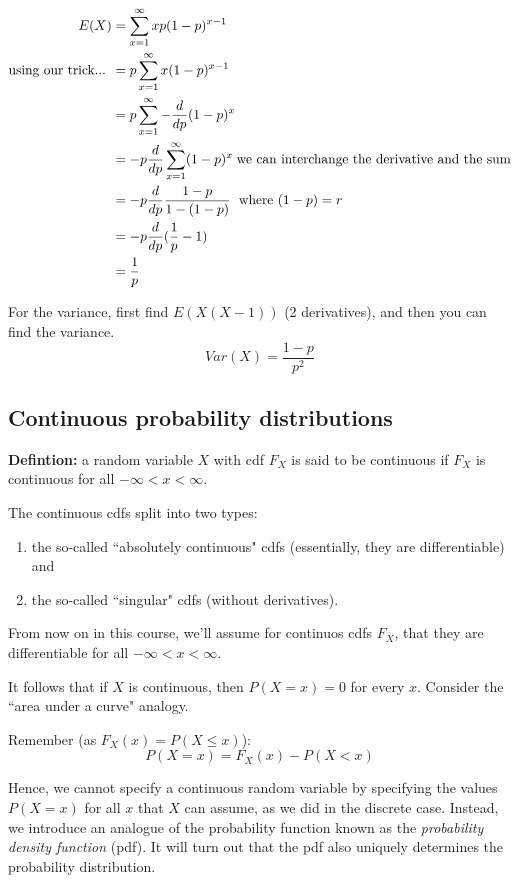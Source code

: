 \documentclass[12pt]{article}
\begin{document}
\begin{align*}
    E(X) &= \sum_{x=1}^{\infty} x p (1-p)^{x-1} \\
    \textnormal{using our trick... }   &=  p \sum_{x=1}^{\infty} x (1-p)^{x-1} \\
        &= p \sum_{x=1}^{\infty} - \frac{d}{dp} (1-p)^{x} \\
        &= -p \frac{d}{dp} \sum_{x=1}^{\infty} (1-p)^{x} \; \textnormal{we can interchange the derivative and the sum} \\
        &= -p \frac{d}{dp} \frac{1-p}{1-(1-p)} \; \textnormal{ where } (1-p) = r \\
        &= -p \frac{d}{dp} (\frac{1}{p} - 1) \\
        &= \frac{1}{p}
\end{align*}

For the variance, first find $E(X(X-1))$ (2 derivatives), and then you can find the variance.
\[
    Var(X) = \frac{1-p}{p^2}
\]

\subsection{Continuous probability distributions}
\textbf{Defintion:} a random variable $X$ with cdf $F_X$ is said to be continuous if $F_X$ is continuous for all $- \infty < x < \infty$.

The continuous cdfs split into two types:
\begin{enumerate}
    \item the so-called ``absolutely continuous" cdfs (essentially, they are differentiable) and
    \item the so-called ``singular" cdfs (without derivatives).
\end{enumerate}

From now on in this course, we'll assume for continuos cdfs $F_X$, that they are differentiable for all $- \infty < x < \infty$.

It follows that if $X$ is continuous, then $P(X=x)=0$ for every $x$. Consider the ``area under a curve" analogy.

Remember (as $F_X (x) = P(X \leq x)$):
\[
    P(X=x) = F_X (x) - P(X < x)
\]

Hence, we cannot specify a continuous random variable by specifying the values $P(X=x)$ for all $x$ that $X$ can assume, as we did in the discrete case. Instead, we introduce an analogue of the probability function known as the \emph{probability density function} (pdf). It will turn out that the pdf also uniquely determines the probability distribution.
\end{document}
